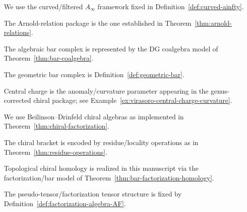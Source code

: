 \begin{definition}\label{def:ainf-algebra}
We use the curved/filtered \(A_\infty\) framework fixed in Definition~\ref{def:curved-ainfty}.
\end{definition}

\begin{definition}\label{def:arnold-relations}
The Arnold-relation package is the one established in Theorem~\ref{thm:arnold-relations}.
\end{definition}

\begin{definition}\label{def:bar-complex-algebraic}
The algebraic bar complex is represented by the DG coalgebra model of Theorem~\ref{thm:bar-coalgebra}.
\end{definition}

\begin{definition}\label{def:geometric-bar-complex}
The geometric bar complex is Definition~\ref{def:geometric-bar}.
\end{definition}

\begin{definition}\label{def:central-charge}
Central charge is the anomaly/curvature parameter appearing in the genus-corrected chiral package; see Example~\ref{ex:virasoro-central-charge-curvature}.
\end{definition}

\begin{definition}\label{def:chiral-algebra-bd}
We use Beilinson--Drinfeld chiral algebras as implemented in Theorem~\ref{thm:chiral-factorization}.
\end{definition}

\begin{construction}\label{constr:chiral-bracket}
The chiral bracket is encoded by residue/locality operations as in Theorem~\ref{thm:residue-operations}.
\end{construction}

\begin{definition}\label{def:topological-chiral-homology}
Topological chiral homology is realized in this manuscript via the factorization/bar model of Theorem~\ref{thm:bar-factorization-homology}.
\end{definition}

\begin{definition}\label{def:chiral-pseudo-tensor}
The pseudo-tensor/factorization tensor structure is fixed by Definition~\ref{def:factorization-algebra-AF}.
\end{definition}


